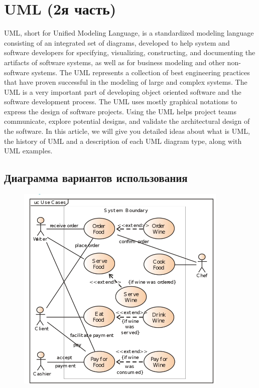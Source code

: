 \documentclass[12pt; a4paper]{book}
\begin{document}
\section{UML  (2я часть)}
UML, short for Unified Modeling Language, is a standardized modeling language consisting of an integrated set of diagrams, developed to help system and software developers for specifying, visualizing, constructing, and documenting the artifacts of software systems, as well as for business modeling and other non-software systems. The UML represents a collection of best engineering practices that have proven successful in the modeling of large and complex systems. The UML is a very important part of developing object oriented software and the software development process. The UML uses mostly graphical notations to express the design of software projects. Using the UML helps project teams communicate, explore potential designs, and validate the architectural design of the software. In this article, we will give you detailed ideas about what is UML, the history of UML and a description of each UML diagram type, along with UML examples.\\
\subsection{Диаграмма вариантов использования}
\begin{figure}[!hbp]
\includegraphics[angle=0, width=0.9\textwidth]{IMG/1} 
\end{figure}
\newpage
\end{document}
